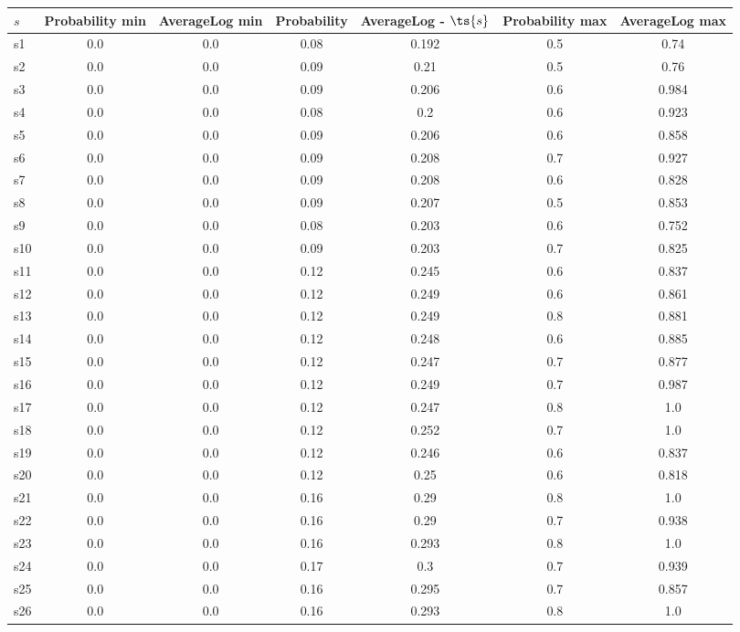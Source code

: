 \documentclass{article}
\begin{document}
\noindent\begin{tabular}{|l|c|c|c|c|c|c|}
\hline
$s$& Probability min & AverageLog min & Probability & AverageLog - $\ts{s}$ & Probability max & AverageLog max\\
\hline
s1 &0.0 & 0.0 & 0.08 & 0.192 & 0.5 & 0.74\\
\hline
s2 &0.0 & 0.0 & 0.09 & 0.21 & 0.5 & 0.76\\
\hline
s3 &0.0 & 0.0 & 0.09 & 0.206 & 0.6 & 0.984\\
\hline
s4 &0.0 & 0.0 & 0.08 & 0.2 & 0.6 & 0.923\\
\hline
s5 &0.0 & 0.0 & 0.09 & 0.206 & 0.6 & 0.858\\
\hline
s6 &0.0 & 0.0 & 0.09 & 0.208 & 0.7 & 0.927\\
\hline
s7 &0.0 & 0.0 & 0.09 & 0.208 & 0.6 & 0.828\\
\hline
s8 &0.0 & 0.0 & 0.09 & 0.207 & 0.5 & 0.853\\
\hline
s9 &0.0 & 0.0 & 0.08 & 0.203 & 0.6 & 0.752\\
\hline
s10 &0.0 & 0.0 & 0.09 & 0.203 & 0.7 & 0.825\\
\hline
s11 &0.0 & 0.0 & 0.12 & 0.245 & 0.6 & 0.837\\
\hline
s12 &0.0 & 0.0 & 0.12 & 0.249 & 0.6 & 0.861\\
\hline
s13 &0.0 & 0.0 & 0.12 & 0.249 & 0.8 & 0.881\\
\hline
s14 &0.0 & 0.0 & 0.12 & 0.248 & 0.6 & 0.885\\
\hline
s15 &0.0 & 0.0 & 0.12 & 0.247 & 0.7 & 0.877\\
\hline
s16 &0.0 & 0.0 & 0.12 & 0.249 & 0.7 & 0.987\\
\hline
s17 &0.0 & 0.0 & 0.12 & 0.247 & 0.8 & 1.0\\
\hline
s18 &0.0 & 0.0 & 0.12 & 0.252 & 0.7 & 1.0\\
\hline
s19 &0.0 & 0.0 & 0.12 & 0.246 & 0.6 & 0.837\\
\hline
s20 &0.0 & 0.0 & 0.12 & 0.25 & 0.6 & 0.818\\
\hline
s21 &0.0 & 0.0 & 0.16 & 0.29 & 0.8 & 1.0\\
\hline
s22 &0.0 & 0.0 & 0.16 & 0.29 & 0.7 & 0.938\\
\hline
s23 &0.0 & 0.0 & 0.16 & 0.293 & 0.8 & 1.0\\
\hline
s24 &0.0 & 0.0 & 0.17 & 0.3 & 0.7 & 0.939\\
\hline
s25 &0.0 & 0.0 & 0.16 & 0.295 & 0.7 & 0.857\\
\hline
s26 &0.0 & 0.0 & 0.16 & 0.293 & 0.8 & 1.0\\

\end{tabular}
\end{document}

